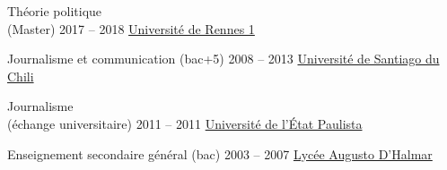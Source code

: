 \begin{yearlist}

\item[Théorie politique \\ (Master)]{2017 -- 2018}
     {\href{https://formations.univ-rennes1.fr/formations/master-2-theorie-politique}{Université de Rennes 1}}
		 {}
     

		 {}


\item[Journalisme et communication (bac+5)]{2008 -- 2013}
     {\href{http://periodismo.usach.cl/} {Université de Santiago du Chili}}
		 {}


\item[Journalisme \\ (échange universitaire)]{2011 -- 2011}
     {\href{http://www.unesp.br/} {Université de l'État Paulista}}
		 {}

\item[Enseignement secon\-daire général (bac)]{2003 \hspace{-0.06cm}-- \hspace{-0.06cm}2007}
     {\href{www.liceoaugustodhalmar.cl/liceo}{Lycée Augusto D'Halmar}}
		 {}		 
		 
		 
		 

\end{yearlist}





%
%



